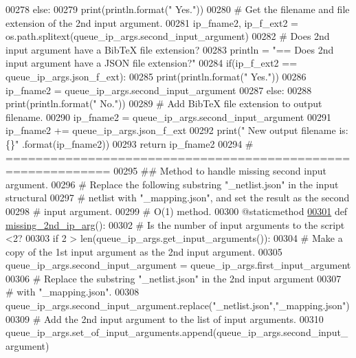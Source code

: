 \begin{DoxyCode}
00278         \textcolor{keywordflow}{else}:
00279             print(println.format(\textcolor{stringliteral}{"  Yes."}))
00280         \textcolor{comment}{#   Get the filename and file extension of the 2nd input argument.}
00281         ip\_fname2, ip\_f\_ext2 = os.path.splitext(queue\_ip\_args.second\_input\_argument)
00282         \textcolor{comment}{#   Does 2nd input argument have a BibTeX file extension?}
00283         println = \textcolor{stringliteral}{"==   Does 2nd input argument have a JSON file extension?"}
00284         if(ip\_f\_ext2 == queue\_ip\_args.json\_f\_ext):
00285             print(println.format(\textcolor{stringliteral}{"  Yes."}))
00286             ip\_fname2 = queue\_ip\_args.second\_input\_argument
00287         \textcolor{keywordflow}{else}:
00288             print(println.format(\textcolor{stringliteral}{"  No."}))
00289             \textcolor{comment}{#   Add BibTeX file extension to output filename.}
00290             ip\_fname2 = queue\_ip\_args.second\_input\_argument
00291             ip\_fname2 += queue\_ip\_args.json\_f\_ext
00292             print(\textcolor{stringliteral}{" New output filename is: \{\}"} .format(ip\_fname2))
00293         \textcolor{keywordflow}{return} ip\_fname2
00294     \textcolor{comment}{# ============================================================}
00295     \textcolor{comment}{##  Method to handle missing second input argument.}
00296     \textcolor{comment}{#   Replace the following substring "\_netlist.json" in the input structural}
00297     \textcolor{comment}{#       netlist with "\_mapping.json", and set the result as the second}
00298     \textcolor{comment}{#       input argument.}
00299     \textcolor{comment}{#   O(1) method.}
00300     @staticmethod
\hypertarget{queue__ip__arguments_8py_source_l00301}{}\hyperlink{classutilities_1_1queue__ip__arguments_1_1queue__ip__args_a4420d4d6a1272816131b5426bfaf678e}{00301}     \textcolor{keyword}{def }\hyperlink{classutilities_1_1queue__ip__arguments_1_1queue__ip__args_a4420d4d6a1272816131b5426bfaf678e}{missing\_2nd\_ip\_arg}():
00302         \textcolor{comment}{#   Is the number of input arguments to the script <2?}
00303         \textcolor{keywordflow}{if} 2 > len(queue\_ip\_args.get\_input\_arguments()):
00304             \textcolor{comment}{# Make a copy of the 1st input argument as the 2nd input argument.}
00305             queue\_ip\_args.second\_input\_argument = queue\_ip\_args.first\_input\_argument
00306             \textcolor{comment}{# Replace the substring "\_netlist.json" in the 2nd input argument}
00307             \textcolor{comment}{#   with "\_mapping.json".}
00308             queue\_ip\_args.second\_input\_argument.replace(\textcolor{stringliteral}{"\_netlist.json"},\textcolor{stringliteral}{"\_mapping.json"})
00309             \textcolor{comment}{#   Add the 2nd input argument to the list of input arguments.}
00310             queue\_ip\_args.set\_of\_input\_arguments.append(queue\_ip\_args.second\_input\_argument)
\end{DoxyCode}
